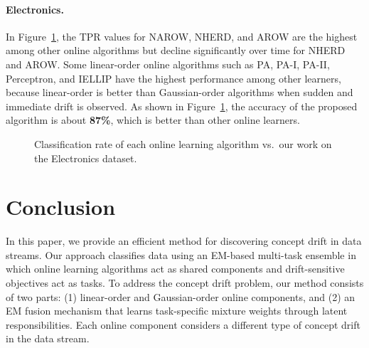 \documentclass[12pt,a4paper]{article}
\begin{document}
	\paragraph{Electronics.} In Figure~\ref{fig:electronic}, the TPR values for NAROW, NHERD, and AROW are the highest among other online algorithms but decline significantly over time for NHERD and AROW. Some linear-order online algorithms such as PA, PA-I, PA-II, Perceptron, and IELLIP have the highest performance among other learners, because linear-order is better than Gaussian-order algorithms when sudden and immediate drift is observed. As shown in Figure~\ref{fig:electronic}, the accuracy of the proposed algorithm is about \textbf{87\%}, which is better than other online learners.
	
	\begin{figure}[H]
		\centering
		\caption{Classification rate of each online learning algorithm vs.\ our work on the Electronics dataset.}
		\label{fig:electronic}
	\end{figure}
	
	\section{Conclusion}
	\label{sec:conclusion}
	
	In this paper, we provide an efficient method for discovering concept drift in data streams. Our approach classifies data using an EM-based multi-task ensemble in which online learning algorithms act as shared components and drift-sensitive objectives act as tasks. To address the concept drift problem, our method consists of two parts: (1) linear-order and Gaussian-order online components, and (2) an EM fusion mechanism that learns task-specific mixture weights through latent responsibilities. Each online component considers a different type of concept drift in the data stream.
	
\end{document}
